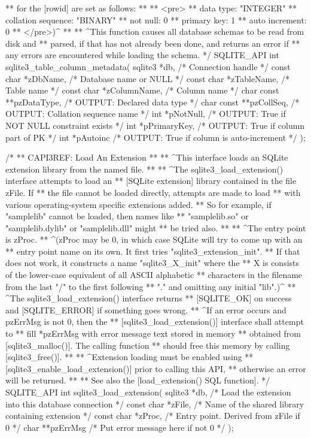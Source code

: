 \begin{Codex}[label=sqlite3.h,numbers=left]
{** for the [rowid] are set as follows:
**
** <pre>
**     data type: "INTEGER"
**     collation sequence: "BINARY"
**     not null: 0
**     primary key: 1
**     auto increment: 0
** </pre>)^
**
** ^This function causes all database schemas to be read from disk and
** parsed, if that has not already been done, and returns an error if
** any errors are encountered while loading the schema.
*/
SQLITE_API int sqlite3_table_column_metadata(
  sqlite3 *db,                /* Connection handle */
  const char *zDbName,        /* Database name or NULL */
  const char *zTableName,     /* Table name */
  const char *zColumnName,    /* Column name */
  char const **pzDataType,    /* OUTPUT: Declared data type */
  char const **pzCollSeq,     /* OUTPUT: Collation sequence name */
  int *pNotNull,              /* OUTPUT: True if NOT NULL constraint exists */
  int *pPrimaryKey,           /* OUTPUT: True if column part of PK */
  int *pAutoinc               /* OUTPUT: True if column is auto-increment */
);

/*
** CAPI3REF: Load An Extension
**
** ^This interface loads an SQLite extension library from the named file.
**
** ^The sqlite3_load_extension() interface attempts to load an
** [SQLite extension] library contained in the file zFile.  If
** the file cannot be loaded directly, attempts are made to load
** with various operating-system specific extensions added.
** So for example, if "samplelib" cannot be loaded, then names like
** "samplelib.so" or "samplelib.dylib" or "samplelib.dll" might
** be tried also.
**
** ^The entry point is zProc.
** ^(zProc may be 0, in which case SQLite will try to come up with an
** entry point name on its own.  It first tries "sqlite3_extension_init".
** If that does not work, it constructs a name "sqlite3_X_init" where the
** X is consists of the lower-case equivalent of all ASCII alphabetic
** characters in the filename from the last "/" to the first following
** "." and omitting any initial "lib".)^
** ^The sqlite3_load_extension() interface returns
** [SQLITE_OK] on success and [SQLITE_ERROR] if something goes wrong.
** ^If an error occurs and pzErrMsg is not 0, then the
** [sqlite3_load_extension()] interface shall attempt to
** fill *pzErrMsg with error message text stored in memory
** obtained from [sqlite3_malloc()]. The calling function
** should free this memory by calling [sqlite3_free()].
**
** ^Extension loading must be enabled using
** [sqlite3_enable_load_extension()] prior to calling this API,
** otherwise an error will be returned.
**
** See also the [load_extension() SQL function].
*/
SQLITE_API int sqlite3_load_extension(
  sqlite3 *db,          /* Load the extension into this database connection */
  const char *zFile,    /* Name of the shared library containing extension */
  const char *zProc,    /* Entry point.  Derived from zFile if 0 */
  char **pzErrMsg       /* Put error message here if not 0 */
);

}
\end{Codex}
